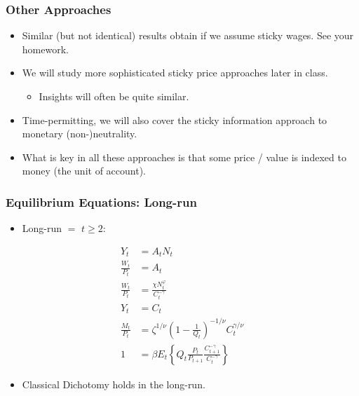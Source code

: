 \documentclass[english,xcolor=svgnames]{beamer}
\begin{document}
\begin{frame}
\frametitle{Other Approaches
}
\begin{itemize}
	\item Similar (but not identical) results obtain if we assume sticky wages. See your homework.
	\item We will study more sophisticated sticky price approaches later in class.
	\begin{itemize}
		\item Insights will often be quite similar.
	\end{itemize}
	\item Time-permitting, we will also cover the sticky information approach to monetary (non-)neutrality.
	\item What is key in all these approaches is that some price / value is indexed to money (the unit of account).
\end{itemize}	
\end{frame}


\begin{frame}
\frametitle{Equilibrium Equations: Long-run}
\begin{itemize}
	\item Long-run $=$ $t\ge 2$:
\end{itemize}
\begin{align*}
	Y_t&=A_tN_{t}  \\
	\frac{W_t}{P_t}&= A_t  \\
	\frac{W_t}{P_t}&=\frac{\chi N_t^\varphi}{C_t^{-\gamma}} \\
	Y_t&=C_t \\
	\frac{M_t}{P_t}&=\zeta^{1/\nu}\left(1-\frac{1}{Q_t}\right)^{-1/\nu}C_{t}^{\gamma/\nu}\\
	1&=\beta E_t\left\{Q_t \frac{P_t}{P_{t+1}} \frac{C_{t+1}^{-\gamma}}{C_{t}^{-\gamma}}\right\} 
\end{align*}
\begin{itemize}
	\item Classical Dichotomy holds in the long-run.
\end{itemize}
\end{frame}
\end{document}
